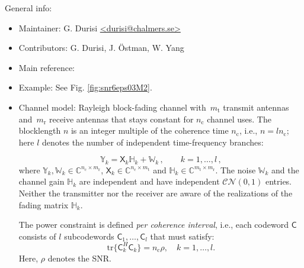 \documentclass[a4paper,11p]{memoir}
\def\txant{m_{\mathrm{t}}} %
\def\rxant{m_{\mathrm{r}}} %
\def\cohtime{n_{\mathrm{c}}} %
\def\bl{n} %
\def\snr{\rho} %
\def\tfdiv{l}  %
\def\tr{\mathrm{tr}}
\begin{document}
General info:
\begin{itemize}
  \item Maintainer: G. Durisi \url{<durisi@chalmers.se>}
  
  \item Contributors: G. Durisi, J. \"Ostman, W. Yang

  \item Main reference: \cite{durisi14-12a} 

  \item Example: See Fig. \ref{fig:snr6eps03M2}.
  
  \item Channel model: Rayleigh block-fading channel with~$\txant$ 
  transmit antennas and~$\rxant$ receive antennas that stays constant for
   $\cohtime$ channel uses.
  The blocklength $\bl$ is an integer multiple of the coherence time $\cohtime$, i.e., $\bl=\tfdiv\cohtime$; here
  $\tfdiv$ denotes the number of independent time-frequency branches:
  
  \begin{equation}\label{eq:bfmimo}
  	\mathbb{Y}_k = \mathsf{X}_k \mathbb{H}_k + \mathbb{W}_k\,, \qquad k=1,\ldots, \tfdiv\,,
\end{equation}  
  where $\mathbb{Y}_k, \mathbb{W}_k \in \mathbb{C}^{\cohtime \times \rxant}$, $\mathsf{X}_k \in \mathbb{C}^{\cohtime \times
  \txant}$ and $\mathbb{H}_k\in\mathbb{C}^{\txant \times \rxant}$. The noise $\mathbb{W}_k$ and the channel gain
  $\mathbb{H}_k$ are independent and have independent $\mathcal{CN}(0,1)$ entries.
  Neither the transmitter nor the receiver are aware of the realizations of the fading matrix $\mathbb{H}_k$.


  The power constraint is defined \textit{per coherence interval}, i.e., each codeword $\mathsf{C}$  consists of $\tfdiv$ subcodewords $\mathsf{C}_1,\ldots, \mathsf{C}_\tfdiv$ that must
  satisfy:
    \begin{equation*}
      \tr\bigl\{\mathsf{C}_{k}^H \mathsf{C}_{k}\bigr\}= \cohtime\snr,\quad  k=1,\dots,\tfdiv. 
    \end{equation*}
    Here, $\snr$ denotes the SNR. 


\end{itemize}
\end{document}
